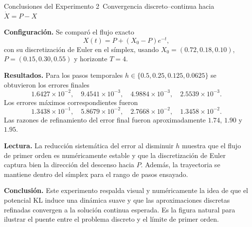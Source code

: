 \documentclass[10pt]{article}
\begin{document}
\small
\begin{center}
{\Large Conclusiones del Experimento 2}\
Convergencia discreto--continua hacia $\dot X=P-X$
\end{center}

\textbf{Configuraci\'on.} Se compar\'o el flujo exacto
\[
X(t)=P+(X_0-P)e^{-t},
\]
con su discretizaci\'on de Euler en el s\'implex, usando $X_0=(0.72,0.18,0.10)$, $P=(0.15,0.30,0.55)$ y horizonte $T=4$.

\textbf{Resultados.} Para los pasos temporales $h\in\{0.5,0.25,0.125,0.0625\}$ se obtuvieron los errores finales
\[
1.6427\times 10^{-2},\quad 9.4541\times 10^{-3},\quad 4.9884\times 10^{-3},\quad 2.5539\times 10^{-3}.
\]
Los errores m\'aximos correspondientes fueron
\[
1.3438\times 10^{-1},\quad 5.8679\times 10^{-2},\quad 2.7668\times 10^{-2},\quad 1.3458\times 10^{-2}.
\]
Las razones de refinamiento del error final fueron aproximadamente $1.74$, $1.90$ y $1.95$.

\textbf{Lectura.} La reducci\'on sistem\'atica del error al disminuir $h$ muestra que el flujo de primer orden es num\'ericamente estable y que la discretizaci\'on de Euler captura bien la direcci\'on del descenso hacia $P$. Adem\'as, la trayectoria se mantiene dentro del s\'implex para el rango de pasos ensayado.

\textbf{Conclusi\'on.} Este experimento respalda visual y num\'ericamente la idea de que el potencial KL induce una din\'amica suave y que las aproximaciones discretas refinadas convergen a la soluci\'on continua esperada. Es la figura natural para ilustrar el puente entre el problema discreto y el l\'imite de primer orden.
\end{document}

